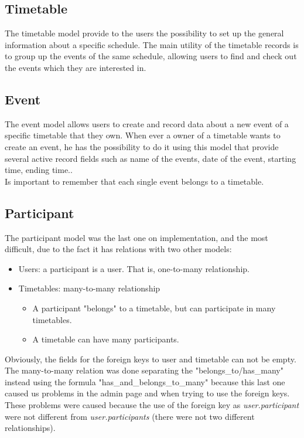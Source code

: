 \subsection{Timetable}
The timetable model provide to the users the possibility to set up the general information about a specific schedule. The main utility of the timetable records is to group up the events of the same schedule, allowing users to find and check out the events which they are interested in.
\subsection{Event}
The event model allows users to create and record data about a new event of a specific timetable that they own. When ever a owner of a timetable wants to create an event, he has the possibility to do it using this model that provide several active record fields such as name of the events, date of the event, starting time, ending time.. \\
Is important to remember that each single event belongs to a timetable.
\subsection{Participant}
The participant model was the last one on implementation, and the most difficult, due to the fact it has relations with two other models:
\begin{itemize} \setlength{\itemsep}{-5pt}
\item Users: a participant is a user. That is, one-to-many relationship.
\item Timetables: many-to-many relationship
\begin{itemize} \setlength{\itemsep}{-5pt}
\item A participant "belongs" to a timetable, but can participate in many timetables.
\item A timetable can have many participants.
\end{itemize}
\end{itemize} 
Obviously, the fields for the foreign keys to user and timetable can not be empty.\\
The many-to-many relation was done separating the "belongs\_to/has\_many" instead using the formula "has\_and\_belongs\_to\_many" because this last one caused us problems in the admin page and when trying to use the foreign keys. These problems were caused  because the use of the foreign key as \textit{user.participant} were not different from \textit{user.participants} (there were not two different relationships).
